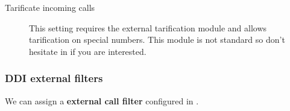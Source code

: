 \documentclass[letterpaper,10pt,english]{sphinxmanual}
\begin{document}
\begin{description}
\item[{Tarificate incoming calls}] \leavevmode{}\label{administration_portal/client/vpbx/ddis:term-tarificate-incoming-calls}
This setting requires the external tarification module and allows
tarification on special numbers. This module is not standard so don't
hesitate in {\hyperref[basic_concepts/intro/getting_help:getting\string-help]{}} if you are interested.

\end{description}


\subsubsection{DDI external filters}
\label{administration_portal/client/vpbx/ddis:ddi-external-filters}
We can assign a \textbf{external call filter} configured in {\hyperref[administration_portal/client/vpbx/routing_tools/external_call_filters:external\string-call\string-filters]{}}.
\end{document}
